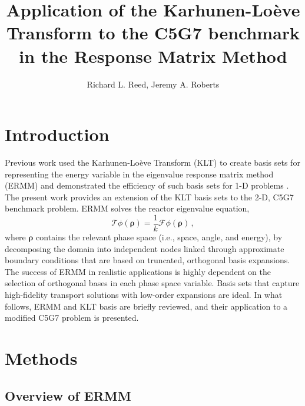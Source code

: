 \documentclass{anstrans}
\title{Application of the Karhunen-Lo\`{e}ve Transform to the C5G7 benchmark in
the Response Matrix Method}
\author{Richard L. Reed, Jeremy A. Roberts}
\institute{
Mechanical and Nuclear Engineering, Kansas State University, Manhattan, KS
}
\begin{document}
\section{Introduction}

Previous work used the Karhunen-Lo\`{e}ve Transform (KLT) to create
basis sets for representing the energy variable in the eigenvalue response
matrix method (ERMM) and demonstrated the efficiency of such basis sets for
1-D problems \cite{annualANS, reedThesis}.
 The present work provides an extension of the KLT basis sets to the 2-D, C5G7
benchmark problem. ERMM solves the reactor eigenvalue equation,
\begin{equation}
  \mathcal{T} \phi(\bm{\rho}) =
    \frac{1}{k} \mathcal{F} \phi(\bm{\rho}) \, ,
  \label{eq:global}
\end{equation}
where $\bm{\rho}$ contains the relevant phase space (i.e., space, angle, and
energy),
by decomposing the domain into independent nodes linked through approximate
boundary conditions that are based on truncated, orthogonal basis expansions.
The
success of ERMM in realistic applications is highly dependent on the
selection of orthogonal bases in each phase space variable.  Basis
sets that capture
high-fidelity transport solutions with low-order expansions are ideal.
In what follows, ERMM and KLT basis are briefly reviewed, and their application
to a modified C5G7 problem is presented.

\section{Methods}

\subsection{Overview of ERMM}
\end{document}

